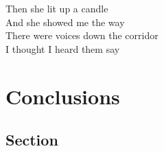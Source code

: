 \begin{savequote}[80mm]
Then she lit up a candle \\
And she showed me the way \\
There were voices down the corridor \\
I thought I heard them say
\end{savequote}

\chapter{Conclusions}
\label{conclu}
\thispagestyle{fancy}

\section*{Section}

\lipsum[1-3] 